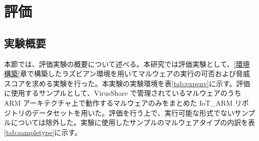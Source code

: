 \documentclass[12pt,a4paper,titlepage,report]{jsbook}
\begin{document}


\chapter{評価}
\section{実験概要}
本節では、評価実験の概要について述べる。本研究では評価実験として、\ref{環境構築}章で構築したラズビアン環境を用いてマルウェアの実行の可否および脅威スコアを求める実験を行った。本実験の実験環境を表\ref{tab:expenv}に示す。評価に使用するサンプルとして、VirusShare で管理されているマルウェアのうち ARM アーキテクチャ上で動作するマルウェアのみをまとめた IoT\_ARM リポジトリ\*のデータセットを用いた。評価を行う上で、実行可能な形式でないサンプルについては除外した。実験に使用したサンプルのマルウェアタイプの内訳を表\ref{tab:sampletype}に示す。

\begin{table}[htbp]
	\caption{実験環境}
	\label{tab:expenv}
	\centering
	\\
\end{table}

\begin{table}[htbp]
	\caption{サンプルのマルウェアタイプ内訳}
	\label{tab:sampletype}
	\centering
	\\
\end{table}
\end{document}
